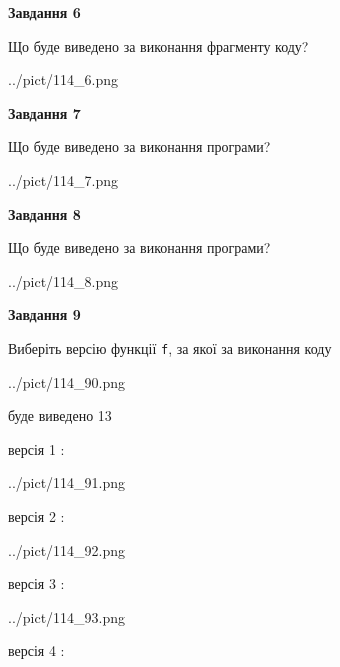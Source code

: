 \documentclass[12pt, ukrainian]{article}
\def\code#1{\Verb!#1!}
\begin{document}
{\begin {large}
{\begin {center}\textbf{Завдання 6}\end {center}}

Що буде виведено за виконання фрагменту коду?\par
\begin{center}
	{../pict/114_6.png}
\end{center}
\newpage

{\begin {center}\textbf{Завдання 7}\end {center}}

Що буде виведено за виконання програми?\par
\begin{center}
	{../pict/114_7.png}
\end{center}
\newpage

{\begin {center}\textbf{Завдання 8}\end {center}}

Що буде виведено за виконання програми?\par
\begin{center}
	{../pict/114_8.png}
\end{center}
\newpage

{\begin {center}\textbf{Завдання 9}\end {center}}

Виберіть версію функції \code{f}, за якої за виконання коду
\begin{center}
	{../pict/114_90.png}
\end{center}
буде виведено 13

\vspace{5mm}
версія 1 :

\begin{center}
	{../pict/114_91.png}
\end{center}
версія 2 :

\begin{center}
	{../pict/114_92.png}
\end{center}
версія 3 :

\begin{center}
	{../pict/114_93.png}
\end{center}
версія 4 :


\end{large}}
\end{document}
